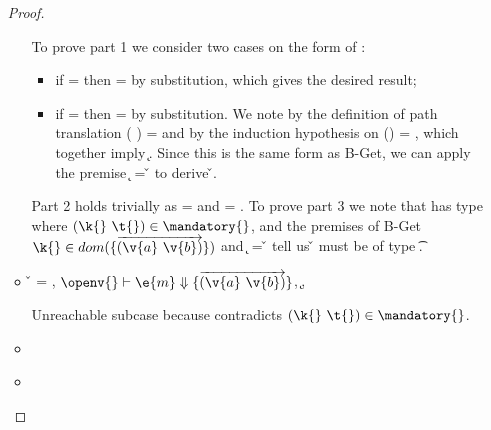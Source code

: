 \begin{lemma}
\begin{enumerate}
\begin{proof}
\begin{case}[T-GetHMap]
\begin{itemize}
\begin{subcase}[B-Get]
         To prove part 1 we consider two cases on the form of : 
         \begin{itemize}
           \item
         if {} = \emptyobject{}
         then \object{} = \emptyobject{} by substitution, which gives the desired result;
           \item
         if  = { {}}
         then \object{} = { {}} by substitution.
         We note by the definition of path translation
         {\openv{}}({ {}}) =
         {}
         and by the induction hypothesis on 
         {{\openv{}}()} = {},
         which together imply 
         \inopenv {\openv{}} {\object{}} { {\k{}}}.
         Since this is the same form as B-Get, we can apply the premise
          {\k{}} = {\v{}}
         to derive \inopenv {\openv{}} {\object{}} {\v{}}.
         \end{itemize}
         
         Part 2 holds trivially as \thenprop{\prop{}} = {\topprop{}}
         and \elseprop{\prop{}} = {\topprop{}}.
         To prove part 3 we note that  has type {\HMapgeneric {\mandatory{}} {\absent{}}}
         where ${\inmandatory{\k{}}{\t{}}{\mandatory{}}}$, and 
         the premises of B-Get
         $\keyinmap{\k{}}{\curlymap{\overrightarrow{({\v{a}}\ {\v{b}})}}}$
         and
          {\k{}} = {\v{}}
         tell us {\v{}} must be of type {\t{}}.

      \end{subcase}
    \item[]
      \begin{subcase}[B-GetMissing]
        \v{} = \nil,
        $\opsem {\openv{}}
        {\e{m}} {\curlymap{\overrightarrow{({\v{a}}\ {\v{b}})}}}$,
       \opsem {\openv{}} {} {\k{}},

       Unreachable subcase because 
       contradicts ${\inmandatory{\k{}}{\t{}}{\mandatory{}}}$.
      \end{subcase}
    \item[]
      \begin{subcase}[BE-Get1]
      \end{subcase}
    \item[]
      \begin{subcase}[BE-Get2]
      \end{subcase}
  \end{itemize}
\end{case}


\end{proof}
\end{enumerate}
\end{lemma}
